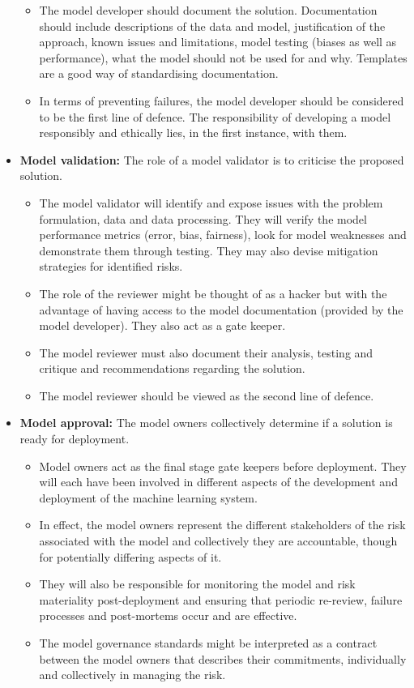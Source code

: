 \begin{itemize}[leftmargin=*]
\begin{itemize}[label=\hexagon]
%
\item The model developer should document the solution. Documentation should include descriptions of the data and model, justification of the approach, known issues and limitations, model testing (biases as well as performance), what the model should not be used for and why. Templates are a good way of standardising documentation.
%
\item In terms of preventing failures, the model developer should be considered to be the first line of defence. The responsibility of developing a model responsibly and ethically lies, in the first instance, with them.
%
\end{itemize}
%
\item \textbf{Model validation:} The role of a model validator is to criticise the proposed solution.
\begin{itemize}[label=\hexagon]
%
\item The model validator will identify and expose issues with the problem formulation, data and data processing. They will verify the model performance metrics (error, bias, fairness), look for model weaknesses and demonstrate them through testing. They may also devise mitigation strategies for identified risks.
%
\item The role of the reviewer might be thought of as a hacker but with the advantage of having access to the model documentation (provided by the model developer). They also act as a gate keeper.
%
\item The model reviewer must also document their analysis, testing and critique and recommendations regarding the solution.
%
\item The model reviewer should be viewed as the second line of defence.
%
\end{itemize}
%
\item \textbf{Model approval:} The model owners collectively determine if a solution is ready for deployment.
\begin{itemize}[label=\hexagon]
%
\item Model owners act as the final stage gate keepers before deployment. They will each have been involved in different aspects of the development and deployment of the machine learning system.
%
\item In effect, the model owners represent the different stakeholders of the risk associated with the model and collectively they are accountable, though for potentially differing aspects of it.
%
\item They will also be responsible for monitoring the model and risk materiality post-deployment and ensuring that periodic re-review, failure processes and post-mortems occur and are effective.
%
\item The model governance standards might be interpreted as a contract between the model owners that describes their commitments, individually and collectively in managing the risk.
%
\end{itemize}
%
\end{itemize}

